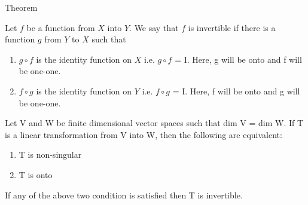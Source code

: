 	{Theorem}
	
	\begin{theorem}\label{eq:solutions/3/2/9/thm1}
		Let $f$ be a function from $X$ into $Y$. We say that $f$ is invertible if there is a function $g$ from $Y$ to $X$ such that
		\begin{enumerate}
			\item $g \circ f$ is the identity function on $X$ i.e. $g \circ f$ = I. Here, g will be onto and f will be one-one.
			\item $f \circ g$ is the identity function on $Y$ i.e. $f \circ g$ = I. Here, f will be onto and g will be one-one.
		\end{enumerate}
	\end{theorem}
	
	\begin{theorem}\label{eq:solutions/3/2/9/thm2}
		Let V and W be finite dimensional vector spaces such that  dim V = dim W. If T is a linear transformation from V into W, then the following are equivalent:
		\begin{enumerate}
			\item T is non-singular
			\item T is onto
		\end{enumerate}
		If any of the above two condition is satisfied then T is invertible.
	\end{theorem}
	
	
	
